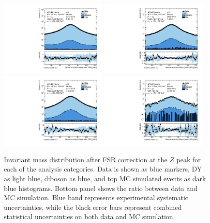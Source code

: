 \begin{figure}[h!]
  \centering
  \includegraphics[width=0.48\textwidth]{figures/hmumu/reso/0jet_1}
  \includegraphics[width=0.48\textwidth]{figures/hmumu/reso/1jet_1}
  \includegraphics[width=0.48\textwidth]{figures/hmumu/reso/2jet_4}
  \includegraphics[width=0.48\textwidth]{figures/hmumu/reso/2jet_1}
  \caption[Mass resolution validation in analysis categories]{
  Invariant mass distribution after FSR correction at the $Z$ peak
  for each of the analysis categories. Data is shown as blue markers,
  DY as light blue, diboson as blue, and top MC simulated events as
  dark blue histograms. Bottom panel shows the ratio between data and
  MC simulation. Blue band represents experimental systematic
  uncertainties, while the black error bars represent combined
  statistical uncertainties on both data and MC simulation.
  }
  \label{fig:hmumu:reso}
\end{figure}



